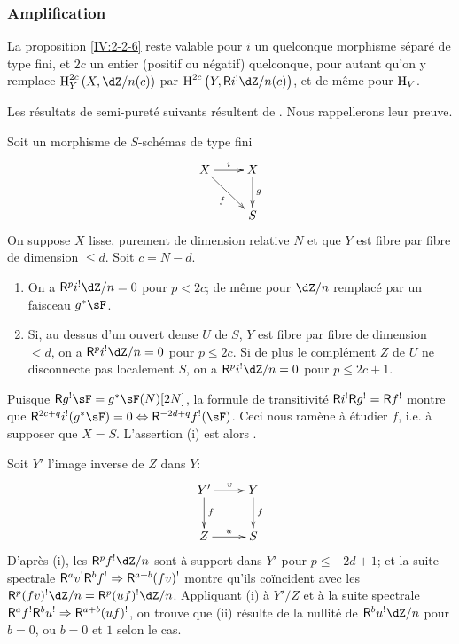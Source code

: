 \subsubsection{Amplification}\label{IV:2-2-7}

La proposition \ref{IV:2-2-6} reste valable pour $i$ un quelconque morphisme 
séparé de type fini, et $2 c$ un entier (positif ou négatif) quelconque, 
pour autant qu'on y remplace $\h_Y^{2 c}\left(X,\dZ/n(c)\right)$ par 
$\h^{2 c}\left(Y,\R i^!\dZ/n(c)\right)$, et de même pour $\operatorname{H}_V$. 

Les résultats de semi-pureté suivants résultent de 
\cite[1.8, 1.10, 1.15]{sga2}. Nous rappellerons leur preuve. 





\begin{theorem}\label{IV:2-2-8}
Soit un morphisme de $S$-schémas de type fini 
\[\xymatrix{
  X \ar[r]^-i \ar[dr]_-f 
    & X \ar[d]^-g \\
  & S
}\]
On suppose $X$ lisse, purement de dimension relative $N$ et que $Y$ est fibre 
par fibre de dimension $\leqslant d$. Soit $c=N-d$. 
\begin{enumerate}[\indent (i)]
  \item On a $\R^p i^!\dZ/n=0$ pour $p<2 c$; de même pour $\dZ/n$ remplacé 
    par un faisceau $g^* \sF$.
  \item Si, au dessus d'un ouvert dense $U$ de $S$, $Y$ est fibre par fibre de 
    dimension $<d$, on a $\R^p i^!\dZ/n=0$ pour $p\leqslant 2 c$. Si de plus le 
    complément $Z$ de $U$ ne disconnecte pas localement $S$, on a 
    $\R^pi^!\dZ/n=0$ pour $p\leqslant 2 c+1$.
\end{enumerate}
\end{theorem}

Puisque $\R g^! \sF=g^*\sF(N)[2N]$, la formule de transitivité 
$\mathsf{R} i^!\mathsf{R} g^!=\mathsf{R} f^!$ montre que 
$\R^{2 c+q} i^!(g^*\sF)=0\Leftrightarrow \R^{-2 d+q}f^!(\sF)$. Ceci nous 
ramène à étudier $f$, i.e. à supposer que $X=S$. L'assertion (i) est 
alors \cite[XVIII 3.17]{sga4}. 

Soit $Y'$ l'image inverse de $Z$ dans $Y$:
\[\xymatrix{
  Y' \ar[r]^-v \ar[d]^-f 
    & Y \ar[d]^-f \\
  Z \ar[r]^-u 
    & S
}\]
D'après (i), les $\R^p f^! \dZ/n$ sont à support dans $Y'$ pour 
$p\leqslant -2 d+1$; et la suite spectrale 
$\mathsf{R}^a v^!\mathsf{R}^b f^! \Rightarrow \mathsf{R}^{a+b} (f v)^!$ montre qu'ils coïncident avec 
les $\R^p(f v)^!\dZ/n=\R^p(u f)^!\dZ/n$. Appliquant (i) à $Y'/Z$ et à la 
suite spectrale $\mathsf{R}^a f^!\mathsf{R}^b u^! \Rightarrow \mathsf{R}^{a+b} (u f)^!$, on trouve que 
(ii) résulte de la nullité de $\R^b u^! \dZ/n$ pour $b=0$, ou $b=0$ et $1$ 
selon le cas. 





